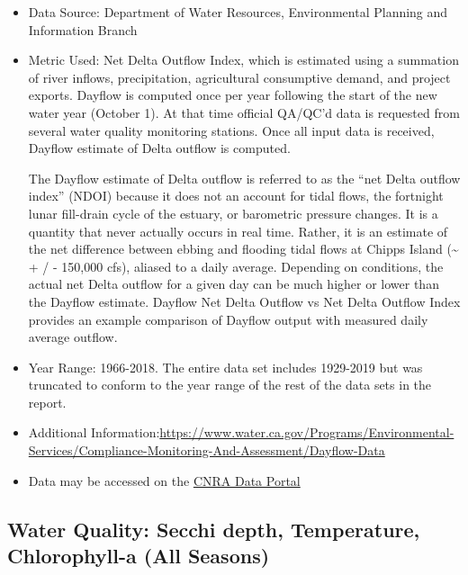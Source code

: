 \documentclass[
]{book}
\begin{document}
\begin{itemize}
\item
  Data Source: Department of Water Resources, Environmental Planning and Information Branch
\item
  Metric Used: Net Delta Outflow Index, which is estimated using a summation of river inflows, precipitation, agricultural consumptive demand, and project exports. Dayflow is computed once per year following the start of the new water year (October 1). At that time official QA/QC'd data is requested from several water quality monitoring stations. Once all input data is received, Dayflow estimate of Delta outflow is computed.

  The Dayflow estimate of Delta outflow is referred to as the ``net Delta outflow index'' (NDOI) because it does not an account for tidal flows, the fortnight lunar fill-drain cycle of the estuary, or barometric pressure changes. It is a quantity that never actually occurs in real time. Rather, it is an estimate of the net difference between ebbing and flooding tidal flows at Chipps Island (\textasciitilde{} + / - 150,000 cfs), aliased to a daily average. Depending on conditions, the actual net Delta outflow for a given day can be much higher or lower than the Dayflow estimate. Dayflow Net Delta Outflow vs Net Delta Outflow Index provides an example comparison of Dayflow output with measured daily average outflow.
\item
  Year Range: 1966-2018. The entire data set includes 1929-2019 but was truncated to conform to the year range of the rest of the data sets in the report.
\item
  Additional Information:\url{https://www.water.ca.gov/Programs/Environmental-Services/Compliance-Monitoring-And-Assessment/Dayflow-Data}
\item
  Data may be accessed on the \href{https://data.cnra.ca.gov/dataset/dayflow}{CNRA Data Portal}
\end{itemize}

\hypertarget{water-quality-secchi-depth-temperature-chlorophyll-a-all-seasons}{%
\subsection{Water Quality: Secchi depth, Temperature, Chlorophyll-a (All Seasons)}\label{water-quality-secchi-depth-temperature-chlorophyll-a-all-seasons}}
\end{document}
